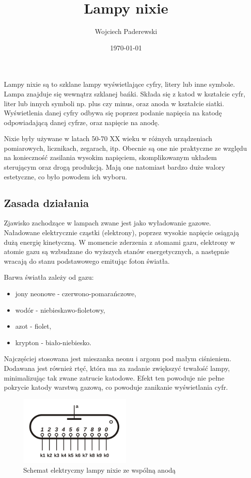 \documentclass[../main.tex]{subfiles}
\author{Wojciech Paderewski}
\date{\today}
\title{Lampy nixie}
\begin{document}
Lampy nixie są to szklane lampy wyświetlające cyfry, litery lub inne symbole.
Lampa znajduje się wewnątrz szklanej bańki. Składa się z katod w kształcie cyfr, liter lub innych symboli np. plus czy minus, oraz anoda w kształcie siatki.
Wyświetlenia danej cyfry odbywa się poprzez podanie napięcia na katodę odpowiadającą danej cyfrze, oraz napięcie na anodę.

Nixie były używane w latach 50-70 XX wieku w różnych urządzeniach pomiarowych, licznikach, zegarach, itp. 
Obecnie są one nie praktyczne ze względu na konieczność zasilania wysokim napięciem, skomplikowanym układem sterującym oraz drogą produkcją.
Mają one natomiast bardzo duże walory estetyczne, co było powodem ich wyboru.

\subsection{Zasada działania}
Zjawisko zachodzące w lampach zwane jest jako wyładowanie gazowe.
Naładowane elektrycznie cząstki (elektrony), poprzez wysokie napięcie osiągają dużą energię kinetyczną.
W momencie zderzenia z atomami gazu, elektrony w atomie gazu są wzbudzane do wyższych stanów energetycznych, a następnie wracają do stanu podstawowego emitując foton światła.

Barwa światła zależy od gazu:
\begin{itemize}
  \item jony neonowe - czerwono-pomarańczowe,
  \item wodór - niebieskawo-fioletowy,
  \item azot - fiolet,
  \item krypton - biało-niebiesko.
\end{itemize}

Najczęściej stosowana jest mieszanka neonu i argonu pod małym ciśnieniem. Dodawana jest również rtęć, która ma za zadanie zwiększyć trwałość lampy, 
minimalizując tak zwane zatrucie katodowe. Efekt ten powoduje nie pełne pokrycie katody warstwą gazową, co powoduje zanikanie wyświetlania cyfr.

\begin{figure}[H]
  \centering
  \includegraphics[width=0.5\textwidth]{Nixie_schematic.png}
  \caption{Schemat elektryczny lampy nixie ze wspólną anodą}
\end{figure}
\end{document}
